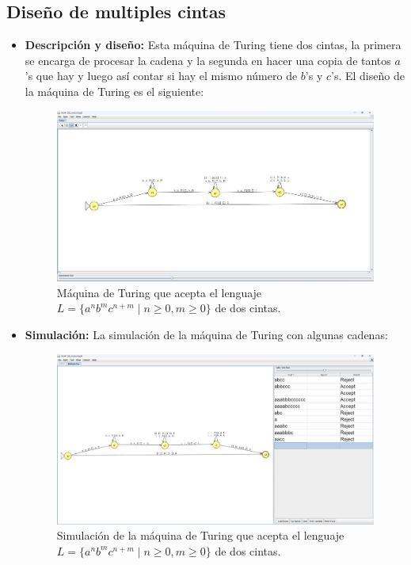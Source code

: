 \documentclass[11pt]{report}
\begin{document}
\subsection{Diseño de multiples cintas}
\begin{itemize}
  \item \textbf{Descripción y diseño:} Esta máquina de Turing tiene dos cintas, la primera se encarga de procesar la cadena y la segunda en hacer una copia de tantos $a$'s que hay y luego así contar si hay el mismo número de $b$'s y $c$'s. El diseño de la máquina de Turing es el siguiente:

        \begin{figure}[H]
          \centering
          \includegraphics[scale=0.3]{img/MT_02_multiple_ribbon.png}
          \caption{Máquina de Turing que acepta el lenguaje $L = \{a^nb^mc^{n+m} \mid n \geq 0, m \geq 0\}$ de dos cintas.}
          \label{fig:maquina de turing que acepta el lenguaje L = {a^nb^mc^{n+m} | n >= 0, m >= 0}}
        \end{figure}

  \newpage

  \item \textbf{Simulación:} La simulación de la máquina de Turing con algunas cadenas:
        \begin{figure}[H]
          \centering
          \includegraphics[scale=0.3]{img/MT_02_multiple_ribbon_simulation.png}
          \caption{Simulación de la máquina de Turing que acepta el lenguaje $L = \{a^nb^mc^{n+m} \mid n \geq 0, m \geq 0\}$ de dos cintas.}
          \label{fig:simulacion de la maquina de turing que acepta el lenguaje L = {a^nb^mc^{n+m} | n >= 0, m >= 0}}
        \end{figure}


\end{itemize}
\end{document}
